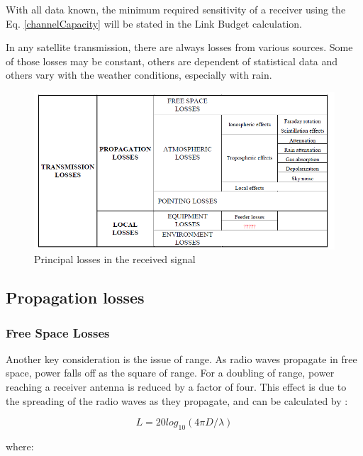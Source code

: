 With all data known, the minimum required sensitivity of a receiver using the Eq. \ref{channelCapacity} will be stated in the Link Budget calculation.

In any satellite transmission, there are always losses from various sources. Some of
those losses may be constant, others are dependent of statistical data and others vary
with the weather conditions, especially with rain.

\begin{figure}[H]
	\includegraphics[scale=0.8]{./sections/SatelliteDept/sections/images/principal_losses}
	\centering
	\caption[Principal losses in the received signal]{Principal losses in the received signal \cite{Jorge2012}}
	\label{principal_losses}
\end{figure}

\subsection{Propagation losses}
\subsubsection{Free Space Losses}
Another key consideration is the issue of range. As radio waves propagate in free space, power falls off as the square of range. For a doubling of range, power reaching a receiver antenna is reduced by a factor of four. This effect is due to the spreading of the radio waves as they propagate, and can be calculated by \cite{Note1998}:

\begin{equation}
L=20log_{10}(4\pi D/\lambda)
\label{FSP}
\end{equation}

where:

